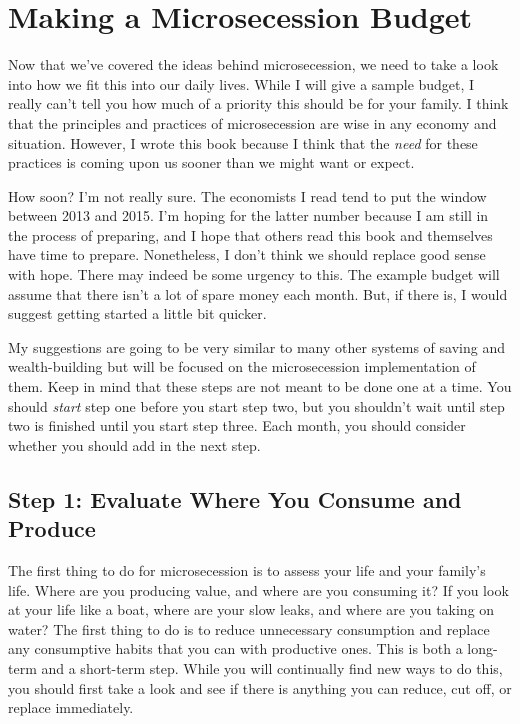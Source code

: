\chapter{Making a Microsecession Budget}

Now that we've covered the ideas behind microsecession,
we need to take a look into how we fit this into our daily lives. While
I will give a sample budget, I really can't tell you
how much of a priority this should be for your family. I think that the
principles and practices of microsecession are wise in any economy and
situation. However, I wrote this book because I think that the
\textit{need} for these practices is coming upon us sooner than we
might want or expect.

How soon?  I'm not really sure. The economists I read
tend to put the window between 2013 and 2015. I'm
hoping for the latter number because I am still in the process of preparing, and I hope
that others read this book and themselves have time to prepare.
Nonetheless, I don't think we should replace good
sense with hope. There may indeed be some urgency to this. The example
budget will assume that there isn't a lot of spare
money each month. But, if there is, I would suggest getting started a
little bit quicker.

My suggestions are going to be very similar to many other systems of
saving and wealth-building but will be focused on the microsecession
implementation of them.  Keep in mind that
these steps are not meant to be done one at a time. You should \textit{start}
step one before you start step two, but you shouldn't
wait until step two is finished until you start step three. Each month,
you should consider whether you should add in the next step.

\section{Step 1: Evaluate Where You Consume and Produce}

The first thing to do for microsecession is to assess your life and your
family's life. Where are you producing value, and
where are you consuming it?  If you look at your life like a boat,
where are your slow leaks, and where are you taking on water?  The
first thing to do is to reduce unnecessary consumption and replace any
consumptive habits that you can with productive ones. This is both a
long-term and a short-term step. While you will continually find new
ways to do this, you should first take a look and see if there is
anything you can reduce, cut off, or replace immediately.

